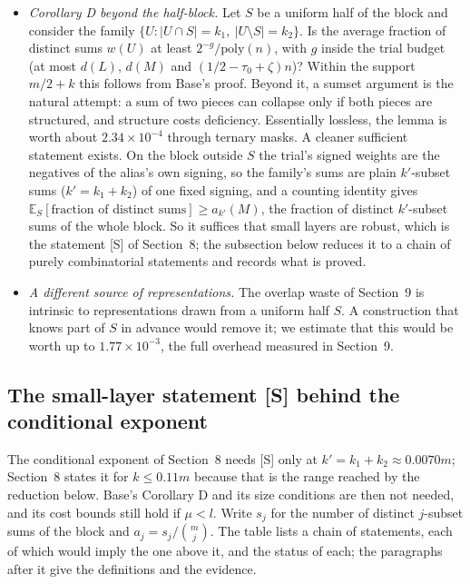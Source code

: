 \documentclass[11pt]{article}
\newcommand{\E}{\mathbb{E}}
\newcommand{\poly}{\mathrm{poly}}
\theoremstyle{plain}
\begin{document}
\begin{itemize}
\item \emph{Corollary D beyond the half-block.} Let $S$ be a uniform half of the block and consider the family $\{U : |U \cap S| = k_1,\ |U \setminus S| = k_2\}$. Is the average fraction of distinct sums $w(U)$ at least $2^{-g}/\poly(n)$, with $g$ inside the trial budget (at most $d(L)$, $d(M)$ and $(1/2 - \tau_0 + \zeta)n$)? Within the support $m/2 + k$ this follows from Base's proof. Beyond it, a sumset argument is the natural attempt: a sum of two pieces can collapse only if both pieces are structured, and structure costs deficiency. Essentially lossless, the lemma is worth about $2.34\times10^{-4}$ through ternary masks. A cleaner sufficient statement exists. On the block outside $S$ the trial's signed weights are the negatives of the alias's own signing, so the family's sums are plain $k'$-subset sums ($k' = k_1 + k_2$) of one fixed signing, and a counting identity gives $\E_S[\text{fraction of distinct sums}] \ge a_{k'}(M)$, the fraction of distinct $k'$-subset sums of the whole block. So it suffices that small layers are robust, which is the statement [S] of Section~8; the subsection below reduces it to a chain of purely combinatorial statements and records what is proved.
\item \emph{A different source of representations.} The overlap waste of Section~9 is intrinsic to representations drawn from a uniform half $S$. A construction that knows part of $S$ in advance would remove it; we estimate that this would be worth up to $1.77\times10^{-3}$, the full overhead measured in Section~9.
\end{itemize}

\subsection*{The small-layer statement [S] behind the conditional exponent}

The conditional exponent of Section~8 needs [S] only at $k' = k_1 + k_2 \approx 0.0070m$; Section~8 states it for $k \le 0.11m$ because that is the range reached by the reduction below. Base's Corollary D and its size conditions are then not needed, and its cost bounds still hold if $\mu < l$. Write $s_j$ for the number of distinct $j$-subset sums of the block and $a_j = s_j/\binom{m}{j}$. The table lists a chain of statements, each of which would imply the one above it, and the status of each; the paragraphs after it give the definitions and the evidence.
\end{document}

